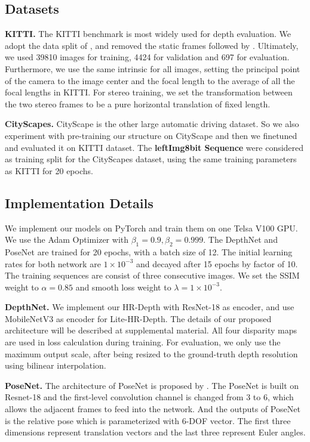 \documentclass[letterpaper]{article} \usepackage{aaai21}  \usepackage{times}  \usepackage{helvet} \usepackage{courier}  \usepackage[hyphens]{url}  \usepackage{graphicx} \urlstyle{rm} \def\UrlFont{\rm}  \usepackage{natbib}  \usepackage{caption} \frenchspacing  \setlength{\pdfpagewidth}{8.5in}  \setlength{\pdfpageheight}{11in}  \usepackage{booktabs}
\begin{document}
\subsection{Datasets}
\textbf{KITTI.} The KITTI benchmark \cite{geiger2013vision} is most widely used for depth evaluation. 
We adopt the data split of \cite{eigen2015predicting}, and removed the static frames followed by \cite{zhou2017unsupervised}. Ultimately, we used 39810 images for training, 4424 for validation and 697 for evaluation. 
Furthermore, we use the same intrinsic for all images, setting the principal point of the camera to the image center and the focal length to the average of all the focal lengths in KITTI. For stereo training, we set the transformation
between the two stereo frames to be a pure horizontal translation of fixed length.

\noindent\textbf{CityScapes.} CityScape \cite{Cordts2016Cityscapes} is the other large automatic driving dataset. So we also experiment with pre-training our structure on CityScape and then we finetuned and evaluated it on KITTI dataset. 
The \textbf{leftImg8bit Sequence} were considered as training split for the CityScapes dataset, using the same training parameters as KITTI for 20 epochs.

\subsection{Implementation Details}
We implement our models on PyTorch\cite{paszke2017automatic} and train them on one Telsa V100 GPU. We use the Adam Optimizer\cite{kingma2014adam} with $\beta_1 = 0.9, \beta_2 = 0.999$. The DepthNet and PoseNet are 
trained for 20 epochs, with a batch size of 12. The initial learning rates for both network are $1\times10^{-3}$ and decayed after 15 epochs by factor of 10. The training sequences are consist of three consecutive 
images. We set the SSIM weight to $\alpha=0.85$ and smooth loss weight to $\lambda=1\times10^{-3}$.

\noindent\textbf{DepthNet.} We implement our HR-Depth with ResNet-18\cite{Resnet} as encoder, and use MobileNetV3\cite{howard2019searching} as encoder for Lite-HR-Depth. The details of our proposed architecture will be described at supplemental material. 
All four disparity maps are used in loss calculation during training. For evaluation, we only use the maximum output scale, after being resized to the ground-truth depth resolution using bilinear interpolation. 

\noindent\textbf{PoseNet.} The architecture of PoseNet is proposed by \cite{godard2019digging}. The PoseNet is built on Resnet-18 and the first-level convolution channel is changed from 3 to 6, which allows the adjacent frames to feed into the network. 
And the outputs of PoseNet is the relative pose which is parameterized with 6-DOF vector. The first three dimensions represent translation vectors and the last three represent Euler angles.
\end{document}
